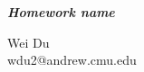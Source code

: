 \documentclass[letterpaper,11pt]{article}
\makeatletter
\newcommand{\soptitle}{Homework name}
\newcommand{\flname}{Wei Du}
\newcommand{\email}{wdu2@andrew.cmu.edu}
\makeatother
\begin{document}
\begin{center}{\huge \slshape \bfseries \soptitle}\end{center}
\begin{center}\vspace{0.2em}
    {\large \flname}\\
    {\email}
\end{center}
\end{document}
